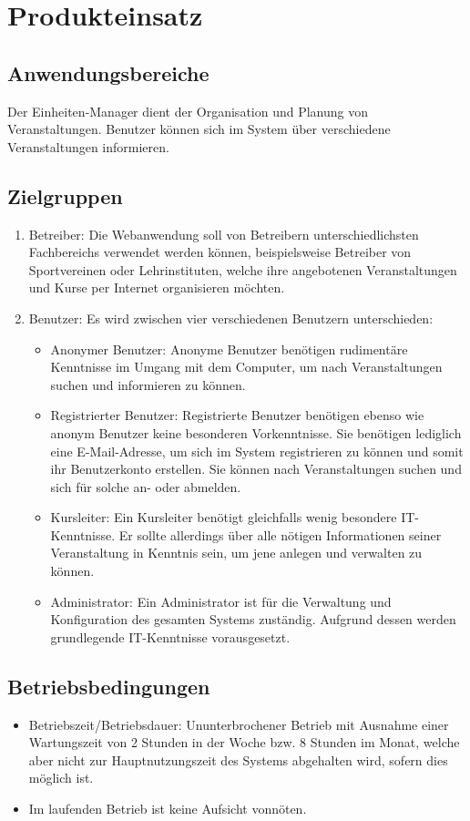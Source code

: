 \documentclass[a4paper]{scrreprt}
\begin{document}
  
\chapter{Produkteinsatz}
    \section{Anwendungsbereiche}
		 Der \gls{Einheiten}-Manager dient der Organisation und Planung von Veranstaltungen. Benutzer können sich im System über verschiedene Veranstaltungen informieren.   
     
	\section{Zielgruppen}
		 \begin{enumerate}
		 	\item Betreiber: Die Webanwendung soll von Betreibern unterschiedlichsten Fachbereichs verwendet werden können, beispielsweise Betreiber von Sportvereinen oder Lehrinstituten, welche ihre angebotenen Veranstaltungen und Kurse per Internet organisieren möchten.
		 	\item Benutzer: Es wird zwischen vier verschiedenen Benutzern unterschieden:
		 	\begin{itemize}
		 		\item Anonymer Benutzer: Anonyme Benutzer benötigen rudimentäre Kenntnisse im Umgang mit dem Computer, um nach 	Veranstaltungen suchen und informieren zu können.
		 		\item Registrierter Benutzer: Registrierte Benutzer benötigen ebenso wie anonym Benutzer keine besonderen Vorkenntnisse. Sie benötigen lediglich eine E-Mail-Adresse, um sich im System registrieren zu können und somit ihr Benutzerkonto erstellen. Sie können nach Veranstaltungen suchen und sich für solche an- oder abmelden.
		 		\item Kursleiter: Ein Kursleiter benötigt gleichfalls wenig besondere IT-Kenntnisse. Er sollte allerdings über alle nötigen Informationen seiner Veranstaltung in Kenntnis sein, um jene anlegen und verwalten zu können.
		 		\item Administrator: Ein Administrator ist für die Verwaltung und \gls{Konfiguration} des gesamten Systems zuständig. Aufgrund dessen werden grundlegende IT-Kenntnisse vorausgesetzt.
		 	\end{itemize}	
		 \end{enumerate}  
        
    
	\section{Betriebsbedingungen}
	       \begin{itemize}
		       	\item Betriebszeit/Betriebsdauer: Ununterbrochener Betrieb mit Ausnahme einer Wartungszeit von 2 Stunden in der Woche bzw. 8 Stunden im Monat, welche aber nicht zur Hauptnutzungszeit des Systems abgehalten wird, sofern dies möglich ist.
		       	\item  Im laufenden Betrieb ist keine Aufsicht vonnöten.
	       \end{itemize}
	
\end{document}
